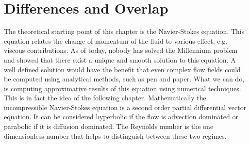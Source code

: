 \section{Differences and Overlap}
\label{sec:shallow_to_thin}

The theoretical starting point of this chapter is the Navier-Stokes equation.
This equation relates the change of momentum of the fluid to various effect, e.g. viscous contributions. 
As of today, nobody has solved the Millennium problem and showed that there exist a unique and smooth solution to this equation.
A well defined solution would have the benefit that even complex flow fields could be computed using analytical methods, such as pen and paper.
What we can do, is computing approximative results of this equation using numerical techniques.
This is in fact the idea of the following chapter.
Mathematically the incompressible Navier-Stokes equation is a second order partial differential vector equation. 
It can be considered hyperbolic if the flow is advection dominated or parabolic if it is diffusion dominated.
The Reynolds number is the one dimensionless number that helps to distinguish between these two regimes. 

